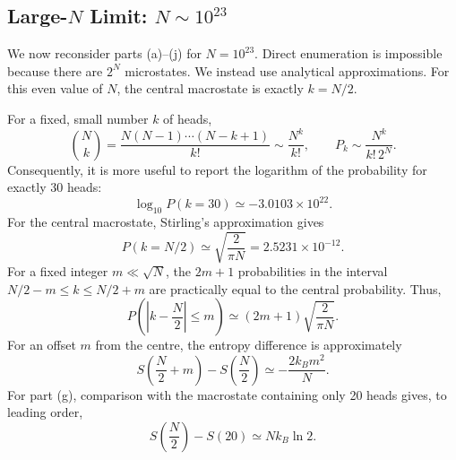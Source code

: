 \documentclass[10pt,a4paper]{article}
\begin{document}
\subsection{Large-\texorpdfstring{$N$}{N} Limit: \texorpdfstring{$N\sim10^{23}$}{N about 10 to the 23}}
We now reconsider parts (a)--(j) for $N=10^{23}$. Direct enumeration is impossible because there are $2^N$ microstates. We instead use analytical approximations. For this even value of $N$, the central macrostate is exactly $k=N/2$.

For a fixed, small number $k$ of heads,
\begin{equation}
  \binom Nk=\frac{N(N-1)\cdots(N-k+1)}{k!}
  \sim\frac{N^k}{k!},\qquad
  P_k\sim\frac{N^k}{k!\,2^N}.
  \label{eq:fixed-k-largeN}
\end{equation}
Consequently, it is more useful to report the logarithm of the probability for exactly 30 heads:
\begin{equation}
  \log_{10}P(k=30)\simeq-3.0103\times10^{22}.
  \label{eq:largeN-p30}
\end{equation}
For the central macrostate, Stirling's approximation gives
\begin{equation}
  P(k=N/2)\simeq\sqrt{\frac{2}{\pi N}}
  =2.5231\times10^{-12}.
  \label{eq:largeN-central}
\end{equation}
For a fixed integer $m\ll\sqrt{N}$, the $2m+1$ probabilities in the interval $N/2-m\leq k\leq N/2+m$ are practically equal to the central probability. Thus,
\begin{equation}
  P\!\left(\left|k-\frac N2\right|\leq m\right)
  \simeq(2m+1)\sqrt{\frac{2}{\pi N}}.
  \label{eq:largeN-window}
\end{equation}
For an offset $m$ from the centre, the entropy difference is approximately
\begin{equation}
  S\!\left(\frac N2+m\right)-S\!\left(\frac N2\right)
  \simeq-\frac{2k_Bm^2}{N}.
  \label{eq:largeN-deltaS}
\end{equation}
For part (g), comparison with the macrostate containing only 20 heads gives, to leading order,
\begin{equation}
  S\!\left(\frac N2\right)-S(20)\simeq Nk_B\ln2.
  \label{eq:largeN-deltaS20}
\end{equation}
\end{document}
